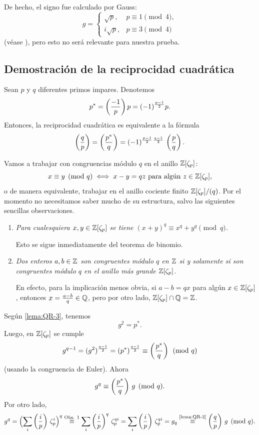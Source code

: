 De hecho, el signo fue calculado por Gauss:
\[ g = \begin{cases}
  \sqrt{p}, & p \equiv 1 \pmod{4},\\
  i\sqrt{p}, & p \equiv 3 \pmod{4}
\end{cases} \]
(véase \cite[Chapter~6]{Ireland-Rosen}), pero esto no será relevante para
nuestra prueba.

\subsection{Demostración de la reciprocidad cuadrática}

Sean $p$ y $q$ diferentes primos impares. Denotemos
$$p^* = \left(\frac{-1}{p}\right) p = (-1)^{\frac{p-1}{2}} p.$$
Entonces, la reciprocidad cuadrática es equivalente a la fórmula
\[ \left(\frac{q}{p}\right) = \left(\frac{p^*}{q}\right) =
   (-1)^{\frac{p-1}{2}\,\frac{q-1}{2}}\,\left(\frac{p}{q}\right). \]

Vamos a trabajar con congruencias módulo $q$ en el anillo $\mathbb{Z} [\zeta_p]$:
$$x \equiv y \pmod{q} \iff x-y = qz \text{ para algún }z\in \mathbb{Z} [\zeta_p],$$
o de manera equivalente, trabajar en el anillo cociente finito
$\mathbb{Z} [\zeta_p]/(q)$. Por el momento no necesitamos saber mucho de su estructura,
salvo las siguientes sencillas observaciones.

\begin{enumerate}
\item \emph{Para cualesquiera $x,y \in \mathbb{Z} [\zeta_p]$ se tiene
  $(x+y)^q \equiv x^q + y^q \pmod{q}$.}

  Esto se sigue inmediatamente del teorema de binomio.

\item \emph{Dos enteros $a,b \in \mathbb{Z}$ son congruentes módulo $q$ en $\mathbb{Z}$ si y
  solamente si son congruentes módulo $q$ en el anillo más grande
  $\mathbb{Z} [\zeta_p]$.}

  En efecto, para la implicación menos obvia, si $a-b = qx$ para algún $x \in
  \mathbb{Z} [\zeta_p]$, entonces $x = \frac{a-b}{q} \in \mathbb{Q}$, pero por otro lado,
  $\mathbb{Z} [\zeta_p] \cap \mathbb{Q} = \mathbb{Z}$.
\end{enumerate}

Según \ref{lema:QR-3}, tenemos
$$g^2 = p^*.$$
Luego, en $\mathbb{Z} [\zeta_p]$ se cumple
\[ g^{q-1} =
   (g^2)^{\frac{q-1}{2}} =
   (p^*)^{\frac{q-1}{2}} \equiv
   \left(\frac{p^*}{q}\right) \pmod{q} \]
(usando la congruencia de Euler). Ahora
$$g^q \equiv \left(\frac{p^*}{q}\right)\,g \pmod{q}.$$
Por otro lado,
\[ g^q =
   \Bigl(\sum_i \left(\frac{i}{p}\right)\,\zeta_p^i\Bigr)^q \stackrel{\text{Obs. 1}}{\equiv}
   \sum_i \left(\frac{i}{p}\right)^q\,\zeta_p^{qi} =
   \sum_i \left(\frac{i}{p}\right)\,\zeta_p^{qi} =
   g_q \stackrel{\text{\ref{lema:QR-2}}}{\equiv}
   \left(\frac{q}{p}\right)\,g \pmod{q}. \]

